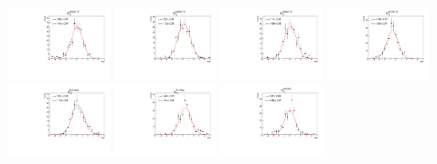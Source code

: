 \begin{figure}[h]\centering
    \includegraphics[width=0.24\textwidth]{figure/io_full_sim/alpha/pull_alpha_Delta_1232_pp.pdf}
    \includegraphics[width=0.24\textwidth]{figure/io_full_sim/alpha/pull_alpha_Delta_1600_pp.pdf}
    \includegraphics[width=0.24\textwidth]{figure/io_full_sim/alpha/pull_alpha_Delta_1620_pp.pdf}
    \includegraphics[width=0.24\textwidth]{figure/io_full_sim/alpha/pull_alpha_Delta_1700_pp.pdf}
    \includegraphics[width=0.24\textwidth]{figure/io_full_sim/alpha/pull_alpha_K_1430_0.pdf}
    \includegraphics[width=0.24\textwidth]{figure/io_full_sim/alpha/pull_alpha_K_700_0.pdf}
    \includegraphics[width=0.24\textwidth]{figure/io_full_sim/alpha/pull_alpha_Lambda_1405_0.pdf}

\end{figure}
